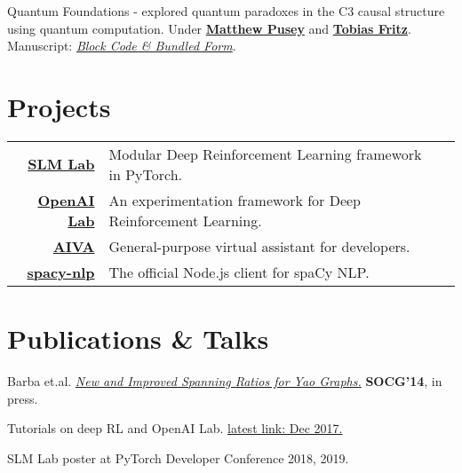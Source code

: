 \documentclass{deedy-resume-openfont}
\begin{document}
\begin{minipage}[t]{0.66\textwidth}
Quantum Foundations - explored quantum paradoxes in the C3 causal structure using quantum computation. Under \textbf{\href{https://www.mattpusey.uk/}{Matthew Pusey}} and \textbf{\href{http://perimeterinstitute.ca/personal/tfritz/}{Tobias Fritz}}. Manuscript: \textit{\href{https://github.com/kengz/Quantum-Foundations-Correlations/blob/master/Keng\%20blockcode.pdf}{Block Code \& Bundled Form}}.
\sectionsep


\section{Projects}
\begin{tabular}{rll}

\href{https://github.com/kengz/SLM-Lab}{\bf SLM Lab}  & Modular Deep Reinforcement Learning framework in PyTorch.\\
\href{https://github.com/kengz/openai_lab}{\bf OpenAI Lab}  & An experimentation framework for Deep Reinforcement Learning.\\
\href{https://github.com/kengz/aiva}{\bf AIVA}  & General-purpose virtual assistant for developers.\\
\href{https://github.com/kengz/spacy-nlp}{\bf spacy-nlp}  & The official Node.js client for spaCy NLP.\\
\end{tabular}
\sectionsep



\section{Publications \& Talks}
\begin{enumerate}[ {[}1{]} ]
\setlength{\itemsep}{0pt}
\setlength{\parskip}{0pt}

\item Barba et.al. \href{http://arxiv.org/pdf/1307.5829.pdf}{\em New and Improved Spanning Ratios for Yao Graphs.} {\bf SOCG'14}, in press.
\item Tutorials on deep RL and OpenAI Lab.  \href{https://insights.untapt.com/openai-lab-for-deep-reinforcement-learning-experimentation-6287867eb611}{latest link: Dec 2017.}
\item SLM Lab poster at PyTorch Developer Conference 2018, 2019.
\end{enumerate}
\sectionsep



\end{minipage}
\end{document}

